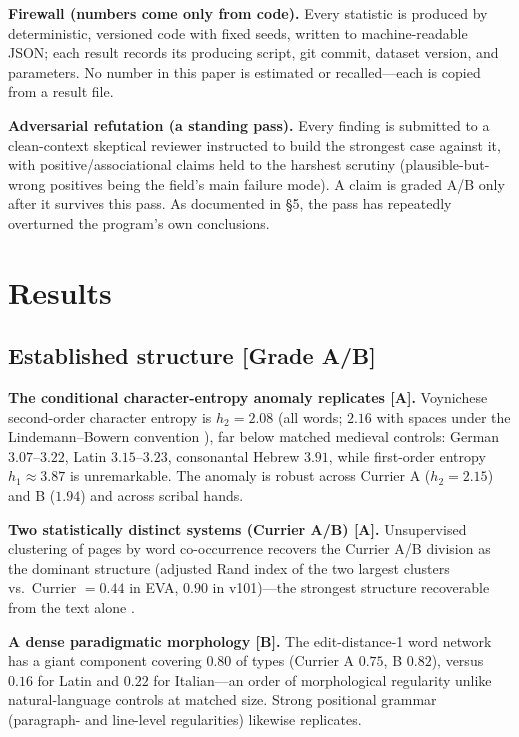 \documentclass[11pt]{article}
\newcommand{\grade}[1]{{\small\textbf{[#1]}}}
\begin{document}
\textbf{Firewall (numbers come only from code).} Every statistic is produced by
deterministic, versioned code with fixed seeds, written to machine-readable JSON;
each result records its producing script, git commit, dataset version, and
parameters. No number in this paper is estimated or recalled---each is copied from a
result file.

\textbf{Adversarial refutation (a standing pass).} Every finding is submitted to a
clean-context skeptical reviewer instructed to build the strongest case against it,
with positive/associational claims held to the harshest scrutiny (plausible-but-wrong
positives being the field's main failure mode). A claim is graded A/B only after it
survives this pass. As documented in \S5, the pass has repeatedly overturned the
program's own conclusions.

\section{Results}

\subsection{Established structure \grade{Grade A/B}}
\textbf{The conditional character-entropy anomaly replicates \grade{A}.} Voynichese
second-order character entropy is $h_2 = 2.08$ (all words; $2.16$ with spaces under
the Lindemann--Bowern convention \citep{lindemann2022entropy}), far below matched
medieval controls: German $3.07$--$3.22$, Latin $3.15$--$3.23$, consonantal Hebrew
$3.91$, while first-order entropy $h_1\approx 3.87$ is unremarkable. The anomaly is
robust across Currier A ($h_2=2.15$) and B ($1.94$) and across scribal hands.

\textbf{Two statistically distinct systems (Currier A/B) \grade{A}.} Unsupervised
clustering of pages by word co-occurrence recovers the Currier A/B division as the
dominant structure (adjusted Rand index of the two largest clusters vs.\ Currier
$=0.44$ in EVA, $0.90$ in v101)---the strongest structure recoverable from the text
alone \citep{montemurro2013keywords}.

\textbf{A dense paradigmatic morphology \grade{B}.} The edit-distance-1 word network
has a giant component covering $0.80$ of types (Currier A $0.75$, B $0.82$), versus
$0.16$ for Latin and $0.22$ for Italian---an order of morphological regularity unlike
natural-language controls at matched size. Strong positional grammar (paragraph- and
line-level regularities) likewise replicates.
\end{document}
